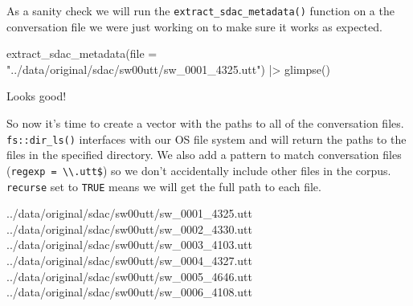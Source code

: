 \documentclass[
  letterpaper,
  DIV=11,
  numbers=noendperiod]{scrreport}
\newenvironment{Shaded}{\begin{snugshade}}{\end{snugshade}}
\newcommand{\AttributeTok}[1]{\textcolor[rgb]{0.00,0.00,0.00}{#1}}
\newcommand{\CommentTok}[1]{\textcolor[rgb]{0.00,0.00,0.00}{\textit{#1}}}
\newcommand{\ConstantTok}[1]{\textcolor[rgb]{0.00,0.00,0.00}{#1}}
\newcommand{\FunctionTok}[1]{\textcolor[rgb]{0.00,0.00,0.00}{#1}}
\newcommand{\NormalTok}[1]{\textcolor[rgb]{0.00,0.00,0.00}{#1}}
\newcommand{\OtherTok}[1]{\textcolor[rgb]{0.00,0.00,0.00}{#1}}
\newcommand{\SpecialCharTok}[1]{\textcolor[rgb]{0.00,0.00,0.00}{#1}}
\newcommand{\StringTok}[1]{\textcolor[rgb]{0.00,0.00,0.00}{#1}}
\theoremstyle{definition}
\theoremstyle{remark}
\begin{document}
As a sanity check we will run the \texttt{extract\_sdac\_metadata()}
function on a the conversation file we were just working on to make sure
it works as expected.

\begin{Shaded}
\begin{Highlighting}[]
\FunctionTok{extract\_sdac\_metadata}\NormalTok{(}\AttributeTok{file =} \StringTok{"../data/original/sdac/sw00utt/sw\_0001\_4325.utt"}\NormalTok{) }\SpecialCharTok{|\textgreater{}} 
  \FunctionTok{glimpse}\NormalTok{()}
\end{Highlighting}
\end{Shaded}

Looks good!

So now it's time to create a vector with the paths to all of the
conversation files. \texttt{fs::dir\_ls()} interfaces with our OS file
system and will return the paths to the files in the specified
directory. We also add a pattern to match conversation files
(\texttt{regexp\ =\ \textbackslash{}\textbackslash{}.utt\$}) so we don't
accidentally include other files in the corpus. \texttt{recurse} set to
\texttt{TRUE} means we will get the full path to each file.

\begin{Shaded}
\end{Shaded}

\begin{Shaded}
\begin{Highlighting}[]
\NormalTok{../data/original/sdac/sw00utt/sw\_0001\_4325.utt}
\NormalTok{../data/original/sdac/sw00utt/sw\_0002\_4330.utt}
\NormalTok{../data/original/sdac/sw00utt/sw\_0003\_4103.utt}
\NormalTok{../data/original/sdac/sw00utt/sw\_0004\_4327.utt}
\NormalTok{../data/original/sdac/sw00utt/sw\_0005\_4646.utt}
\NormalTok{../data/original/sdac/sw00utt/sw\_0006\_4108.utt}
\end{Highlighting}
\end{Shaded}
\end{document}
